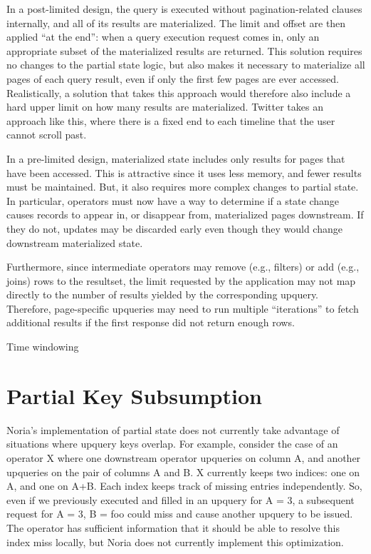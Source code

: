 In a post-limited design, the query is executed without pagination-related
clauses internally, and all of its results are materialized. The limit and
offset are then applied ``at the end'': when a query execution request comes in,
only an appropriate subset of the materialized results are returned. This
solution requires no changes to the partial state logic, but also makes it
necessary to materialize all pages of each query result, even if only the first
few pages are ever accessed. Realistically, a solution that takes this approach
would therefore also include a hard upper limit on how many results are
materialized. Twitter takes an approach like this, where there is a fixed end to
each timeline that the user cannot scroll past.

In a pre-limited design, materialized state includes only results for pages that
have been accessed. This is attractive since it uses less memory, and fewer
results must be maintained. But, it also requires more complex changes to
partial state. In particular, operators must now have a way to determine if a
state change causes records to appear in, or disappear from, materialized pages
downstream. If they do not, updates may be discarded early even though they
would change downstream materialized state.

Furthermore, since intermediate operators may remove (e.g., filters) or add
(e.g., joins) rows to the resultset, the limit requested by the application may
not map directly to the number of results yielded by the corresponding upquery.
Therefore, page-specific upqueries may need to run multiple ``iterations'' to
fetch additional results if the first response did not return enough rows.

\begin{inprogress}
  Time windowing
\end{inprogress}

\section{Partial Key Subsumption}

Noria's implementation of partial state does not currently take advantage of
situations where upquery keys overlap. For example, consider the case of an
operator X where one downstream operator upqueries on column A, and another
upqueries on the pair of columns A and B. X currently keeps two indices: one on
A, and one on A+B. Each index keeps track of missing entries independently. So,
even if we previously executed and filled in an upquery for A = 3, a subsequent
request for A = 3, B = foo could miss and cause another upquery to be issued.
The operator has sufficient information that it should be able to resolve this
index miss locally, but Noria does not currently implement this optimization.
